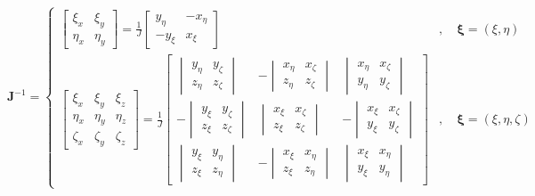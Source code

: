 \documentclass{article}
\newcommand{\bxi}{\boldsymbol{\xi}}
\begin{document}
\begin{equation}\label{InvJacobi}
\mathbf{J}^{-1} = \begin{cases} \begin{bmatrix} \xi_x & \xi_y \\ \eta_x & \eta_y \end{bmatrix} =
\frac{1}{J}\begin{bmatrix} y_{\eta} & -x_{\eta} \\ -y_{\xi} & x_{\xi} \end{bmatrix}	&,\quad\bxi = (\xi,\eta) \\
\begin{bmatrix} \xi_x & \xi_y & \xi_z \\ \eta_x & \eta_y & \eta_z \\ \zeta_x & \zeta_y & \zeta_z \end{bmatrix} =
\frac{1}{J}\begin{bmatrix}
\begin{vmatrix}  y_{\eta} & y_{\zeta} \\ z_{\eta} & z_{\zeta} \end{vmatrix} &
-\begin{vmatrix}  x_{\eta} & x_{\zeta} \\ z_{\eta} & z_{\zeta} \end{vmatrix} &
\begin{vmatrix}  x_{\eta} & x_{\zeta} \\ y_{\eta} & y_{\zeta} \end{vmatrix} \\
-\begin{vmatrix}  y_{\xi} & y_{\zeta} \\ z_{\xi} & z_{\zeta} \end{vmatrix} &
\begin{vmatrix}  x_{\xi} & x_{\zeta} \\ z_{\xi} & z_{\zeta} \end{vmatrix} &
-\begin{vmatrix}  x_{\xi} & x_{\zeta} \\ y_{\xi} & y_{\zeta} \end{vmatrix} \\
\begin{vmatrix}  y_{\xi} & y_{\eta} \\ z_{\xi} & z_{\eta} \end{vmatrix} &
-\begin{vmatrix}  x_{\xi} & x_{\eta} \\ z_{\xi} & z_{\eta} \end{vmatrix} &
\begin{vmatrix}  x_{\xi} & x_{\eta} \\ y_{\xi} & y_{\eta} \end{vmatrix}
\end{bmatrix}	&,\quad\bxi = (\xi,\eta,\zeta)
\end{cases}
\end{equation}
\end{document}
